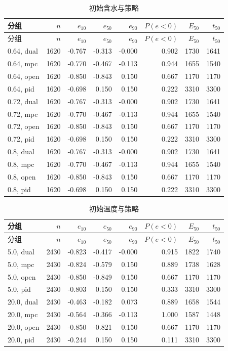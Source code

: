 \begin{longtable}{lrrrrrrr}
\caption{初始含水与策略}\\
\toprule
分组 & $n$ & $e_{10}$ & $e_{50}$ & $e_{90}$ & $P(e{<}0)$ & $E_{50}$ & $t_{50}$ \\
\midrule
\endfirsthead
\toprule
分组 & $n$ & $e_{10}$ & $e_{50}$ & $e_{90}$ & $P(e{<}0)$ & $E_{50}$ & $t_{50}$ \\
\midrule
\endhead
0.64, dual & 1620 & -0.767 & -0.313 & -0.000 & 0.902 & 1730 & 1641 \\
0.64, mpc & 1620 & -0.770 & -0.467 & -0.113 & 0.944 & 1655 & 1540 \\
0.64, open & 1620 & -0.850 & -0.843 & 0.150 & 0.667 & 1170 & 1170 \\
0.64, pid & 1620 & -0.698 & 0.150 & 0.150 & 0.222 & 3310 & 3300 \\
0.72, dual & 1620 & -0.767 & -0.313 & -0.000 & 0.902 & 1730 & 1641 \\
0.72, mpc & 1620 & -0.770 & -0.467 & -0.113 & 0.944 & 1655 & 1540 \\
0.72, open & 1620 & -0.850 & -0.843 & 0.150 & 0.667 & 1170 & 1170 \\
0.72, pid & 1620 & -0.698 & 0.150 & 0.150 & 0.222 & 3310 & 3300 \\
0.8, dual & 1620 & -0.767 & -0.313 & -0.000 & 0.902 & 1730 & 1641 \\
0.8, mpc & 1620 & -0.770 & -0.467 & -0.113 & 0.944 & 1655 & 1540 \\
0.8, open & 1620 & -0.850 & -0.843 & 0.150 & 0.667 & 1170 & 1170 \\
0.8, pid & 1620 & -0.698 & 0.150 & 0.150 & 0.222 & 3310 & 3300 \\
\bottomrule
\end{longtable}

\begin{longtable}{lrrrrrrr}
\caption{初始温度与策略}\\
\toprule
分组 & $n$ & $e_{10}$ & $e_{50}$ & $e_{90}$ & $P(e{<}0)$ & $E_{50}$ & $t_{50}$ \\
\midrule
\endfirsthead
\toprule
分组 & $n$ & $e_{10}$ & $e_{50}$ & $e_{90}$ & $P(e{<}0)$ & $E_{50}$ & $t_{50}$ \\
\midrule
\endhead
5.0, dual & 2430 & -0.823 & -0.417 & -0.000 & 0.915 & 1822 & 1740 \\
5.0, mpc & 2430 & -0.824 & -0.579 & 0.150 & 0.889 & 1738 & 1628 \\
5.0, open & 2430 & -0.850 & -0.849 & 0.150 & 0.667 & 1170 & 1170 \\
5.0, pid & 2430 & -0.803 & 0.150 & 0.150 & 0.333 & 3310 & 3300 \\
20.0, dual & 2430 & -0.463 & -0.182 & 0.073 & 0.889 & 1658 & 1544 \\
20.0, mpc & 2430 & -0.564 & -0.366 & -0.113 & 1.000 & 1587 & 1448 \\
20.0, open & 2430 & -0.850 & -0.821 & 0.150 & 0.667 & 1170 & 1170 \\
20.0, pid & 2430 & -0.244 & 0.150 & 0.150 & 0.111 & 3310 & 3300 \\
\bottomrule
\end{longtable}
